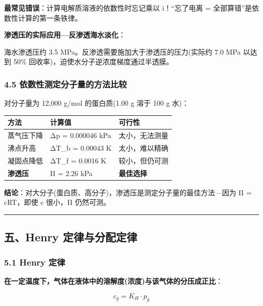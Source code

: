 \textbf{最常见错误}：计算电解质溶液的依数性时忘记乘以 i！``忘了电离 = 全部算错''是依数性计算的第一条铁律。

\textbf{渗透压的实际应用---反渗透海水淡化}：

海水渗透压约 3.5 MPa。反渗透需要施加大于渗透压的压力(实际约 7.0 MPa 以达到 50\% 回收率)，迫使水分子逆浓度梯度通过半透膜。

\subsubsection{4.5 依数性测定分子量的方法比较}\label{ux4f9dux6570ux6027ux6d4bux5b9aux5206ux5b50ux91cfux7684ux65b9ux6cd5ux6bd4ux8f83}

对分子量为 12,000 g/mol 的蛋白质(1.00 g 溶于 100 g 水)：

{\def\LTcaptype{none} %
\begin{longtable}[]{@{}lll@{}}
\toprule\noalign{}
方法 & 计算值 & 可行性 \\
\midrule\noalign{}
\endhead
\bottomrule\noalign{}
\endlastfoot
蒸气压下降 & Δp = 0.000046 kPa & 太小，无法测量 \\
沸点升高 & ΔT\_b = 0.00043 K & 太小，难以精确 \\
凝固点降低 & ΔT\_f = 0.0016 K & 较小，但仍可测 \\
\textbf{渗透压} & Π = 2.26 kPa & \textbf{最佳选择} \\
\end{longtable}
}

\textbf{结论}：对大分子(蛋白质、高分子)，渗透压是测定分子量的最佳方法---因为 Π = cRT，即使 c 很小，Π 仍然可测。

\begin{center}\rule{0.5\linewidth}{0.5pt}\end{center}

\subsection{五、Henry 定律与分配定律}\label{ux4e94henry-ux5b9aux5f8bux4e0eux5206ux914dux5b9aux5f8b}

\subsubsection{5.1 Henry 定律}\label{henry-ux5b9aux5f8b}

\textbf{在一定温度下，气体在液体中的溶解度(浓度)与该气体的分压成正比}：

\[
\boxed{c_g = K_H \cdot p_g}
\]

